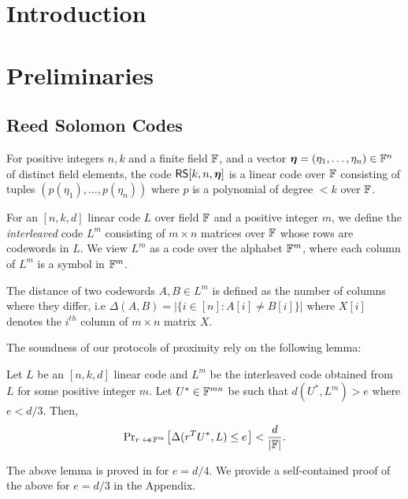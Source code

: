 \section{Introduction}

\section{Preliminaries}
\subsection{Reed Solomon Codes}
\begin{definition}\label{defn:rscodes}{\rm
For positive integers $n,k$ and a finite field $\mathbb{F}$, and a vector
$\bm{\eta}=(\eta_1,\ldots,\eta_n)\in \mathbb{F}^n$ of distinct field elements, the
code $\mathsf{RS}[k,n,{\bm{\eta}}]$ is a linear code over $\mathbb{F}$ consisting of tuples 
$(p(\eta_1),\ldots,p(\eta_n))$ where $p$ is a polynomial of degree $< k$ over
$\mathbb{F}$.
}
\end{definition}

\begin{definition}\label{defn:interleaved}{\rm
For an $[n,k,d]$ linear code $L$ over field $\mathbb{F}$ and a positive integer $m$, we define
the {\em interleaved } code $L^m$ consisting of $m\times n$ matrices over $\mathbb{F}$
whose rows are codewords in $L$. We view $L^m$ as a code over the alphabet
$\mathbb{F}^m$, where each column of $L^m$ is a symbol in $\mathbb{F}^m$.
}
\end{definition}
The distance of two codewords $A,B\in L^m$ is defined as the number of columns
where they differ, i.e $\Delta(A,B)=|\{i\in [n]: A[i]\neq B[i]\}|$ where $X[i]$
denotes the $i^{th}$ column of $m\times n$ matrix $X$. 

The soundness of our protocols of proximity rely on the following lemma:
\begin{lemma}\label{lem:proximitytest}{\rm
Let $L$ be an $[n,k,d]$ linear code and $L^m$ be the interleaved code obtained
from $L$ for some positive integer $m$. Let $U^\ast\in \mathbb{F}^{mn}$ be such that
$d(U^\ast,L^m) > e$ where $e < d/3$. Then,
\begin{align}
\probsub{r\sample \FF^m}{\Delta(r^TU^\ast,L)\leq e} < \frac{d}{|\FF|}.
\end{align}
}
\end{lemma}
The above lemma is proved in \cite{Ligero2017} for $e=d/4$. We provide a
self-contained proof of the above for $e=d/3$ in the Appendix.


